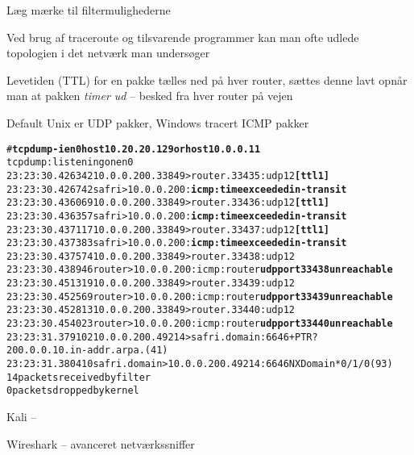 \documentclass[20pt,landscape,a4paper,footrule]{foils}
\begin{document}
\centerline{Læg mærke til filtermulighederne}



\begin{list1}
\item Ved brug af traceroute og tilsvarende programmer kan man ofte
  udlede topologien i det netværk man undersøger
\item Levetiden (TTL) for en pakke tælles ned på hver router, sættes denne lavt
  opnår man at pakken \emph{timer ud} -- besked fra hver router på vejen
\item Default Unix er UDP pakker, Windows tracert ICMP pakker
\end{list1}



\begin{alltt}
\footnotesize # {\bfseries tcpdump -i en0 host 10.20.20.129 or host 10.0.0.11}
tcpdump: listening on en0
23:23:30.426342 10.0.0.200.33849 > router.33435: udp 12 {\bf [ttl 1]}
23:23:30.426742 safri > 10.0.0.200: {\bf icmp: time exceeded in-transit}
23:23:30.436069 10.0.0.200.33849 > router.33436: udp 12 {\bf [ttl 1]}
23:23:30.436357 safri > 10.0.0.200: {\bf icmp: time exceeded in-transit}
23:23:30.437117 10.0.0.200.33849 > router.33437: udp 12 {\bf [ttl 1]}
23:23:30.437383 safri > 10.0.0.200: {\bf icmp: time exceeded in-transit}
23:23:30.437574 10.0.0.200.33849 > router.33438: udp 12
23:23:30.438946 router > 10.0.0.200: icmp: router {\bf udp port 33438 unreachable}
23:23:30.451319 10.0.0.200.33849 > router.33439: udp 12
23:23:30.452569 router > 10.0.0.200: icmp: router {\bf udp port 33439 unreachable}
23:23:30.452813 10.0.0.200.33849 > router.33440: udp 12
23:23:30.454023 router > 10.0.0.200: icmp: router {\bf udp port 33440 unreachable}
23:23:31.379102 10.0.0.200.49214 > safri.domain:  6646+ PTR?
200.0.0.10.in-addr.arpa. (41)
23:23:31.380410 safri.domain > 10.0.0.200.49214:  6646 NXDomain* 0/1/0 (93)
14 packets received by filter
0 packets dropped by kernel
\end{alltt}




\begin{list1}
\item Kali -- 
\item Wireshark --  avanceret netværkssniffer
\end{list1}
\end{document}
